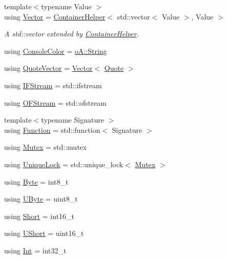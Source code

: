 \begin{DoxyCompactItemize}
{\footnotesize template$<$typename Value $>$ }\\using \mbox{\hyperlink{namespaceo_a_aead0f530bdad1c2e668426680b26017f}{Vector}} = \mbox{\hyperlink{classo_a_1_1_container_helper}{Container\+Helper}}$<$ std\+::vector$<$ Value $>$, Value $>$
\begin{DoxyCompactList}\small\item\em A std\+::vector extended by \mbox{\hyperlink{classo_a_1_1_container_helper}{Container\+Helper}}. \end{DoxyCompactList}\item 
using \mbox{\hyperlink{namespaceo_a_a747e07c1977a29f3e1d38683043ec927}{Console\+Color}} = \mbox{\hyperlink{classo_a_1_1_string}{o\+A\+::\+String}}
\item 
using \mbox{\hyperlink{namespaceo_a_a38695044d9ec0b57190f4e3fab0caffd}{Quote\+Vector}} = \mbox{\hyperlink{namespaceo_a_aead0f530bdad1c2e668426680b26017f}{Vector}}$<$ \mbox{\hyperlink{classo_a_1_1_quote}{Quote}} $>$
\item 
using \mbox{\hyperlink{namespaceo_a_a5cea26f1078da3e5c2fc4529d6459c94}{I\+F\+Stream}} = std\+::ifstream
\item 
using \mbox{\hyperlink{namespaceo_a_a1cab4a0d38a6bab1f5d1390d7a4b5b98}{O\+F\+Stream}} = std\+::ofstream
\item 
{\footnotesize template$<$typename Signature $>$ }\\using \mbox{\hyperlink{namespaceo_a_a85bea86b9d05d2b86c77d8ee5b7bbde5}{Function}} = std\+::function$<$ Signature $>$
\item 
using \mbox{\hyperlink{namespaceo_a_adc2c4dfe90e78df47ae2e677a4d0f9fa}{Mutex}} = std\+::mutex
\item 
using \mbox{\hyperlink{namespaceo_a_a2a6e84e4843983460eace0e5ae899a1e}{Unique\+Lock}} = std\+::unique\+\_\+lock$<$ \mbox{\hyperlink{namespaceo_a_adc2c4dfe90e78df47ae2e677a4d0f9fa}{Mutex}} $>$
\item 
using \mbox{\hyperlink{namespaceo_a_a2b99671898a8eb4bc6ab35036701d732}{Byte}} = int8\+\_\+t
\item 
using \mbox{\hyperlink{namespaceo_a_a8c38e43a304d568b8495770dd8d50513}{U\+Byte}} = uint8\+\_\+t
\item 
using \mbox{\hyperlink{namespaceo_a_a17d2753cd7febb25f447b0cff6cec6eb}{Short}} = int16\+\_\+t
\item 
using \mbox{\hyperlink{namespaceo_a_a0e8a8217ae95045f36575875dcb54537}{U\+Short}} = uint16\+\_\+t
\item 
using \mbox{\hyperlink{namespaceo_a_aa575525a7b0116822c73d43fa671a58c}{Int}} = int32\+\_\+t

\end{DoxyCompactItemize}

